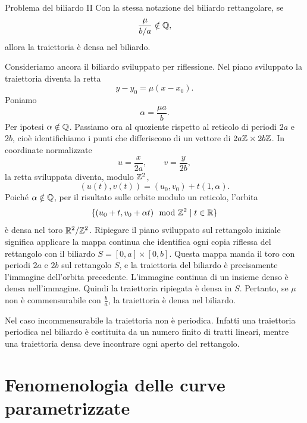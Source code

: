 \documentclass[a4paper]{article}
\begin{document}
\begin{snippetproposition}{Problema del biliardo II}
    Con la stessa notazione del biliardo rettangolare, se \
    \[
        \frac{\mu}{b/a}\notin\mathbb{Q},
    \]
    allora la traiettoria è densa nel biliardo.
\end{snippetproposition}

\begin{snippetproof}{}
    Consideriamo ancora il biliardo sviluppato per riflessione. Nel piano sviluppato la traiettoria diventa la retta
    \[
        y-y_0=\mu(x-x_0).
    \]
    Poniamo
    \[
        \alpha=\frac{\mu a}{b}.
    \]
    Per ipotesi \(\alpha\notin\mathbb{Q}\). Passiamo ora al quoziente rispetto al reticolo di periodi \(2a\) e \(2b\), cioè identifichiamo i punti che differiscono di un vettore di \(2a\mathbb{Z}\times 2b\mathbb{Z}\). In coordinate normalizzate
    \[
        u=\frac{x}{2a},
        \qquad
        v=\frac{y}{2b},
    \]
    la retta sviluppata diventa, modulo \(\mathbb{Z}^2\),
    \[
        (u(t),v(t))=(u_0,v_0)+t(1,\alpha).
    \]
    Poiché \(\alpha\notin\mathbb{Q}\), per il risultato sulle orbite modulo un reticolo, l'orbita
    \[
        \{(u_0+t,v_0+\alpha t)\mod {\mathbb{Z}}^2\mid t\in\mathbb{R}\}
    \]
    è densa nel toro \(\mathbb{R}^2/\mathbb{Z}^2\).
    Ripiegare il piano sviluppato sul rettangolo iniziale significa applicare la mappa continua che identifica ogni copia riflessa del rettangolo con il biliardo \(S=[0,a]\times[0,b]\). Questa mappa manda il toro con periodi \(2a\) e \(2b\) sul rettangolo \(S\), e la traiettoria del biliardo è precisamente l'immagine dell'orbita precedente.
    L'immagine continua di un insieme denso è densa nell'immagine. Quindi la traiettoria ripiegata è densa in \(S\). Pertanto, se \(\mu\) non è commensurabile con \(\frac ba\), la traiettoria è densa nel biliardo.
\end{snippetproof}

\begin{snippetcorollary}{}
Nel caso incommensurabile la traiettoria non è periodica. Infatti una traiettoria periodica nel biliardo è costituita da un numero finito di tratti lineari, mentre una traiettoria densa deve incontrare ogni aperto del rettangolo.
\end{snippetcorollary}

\section{Fenomenologia delle curve parametrizzate}
\end{document}
